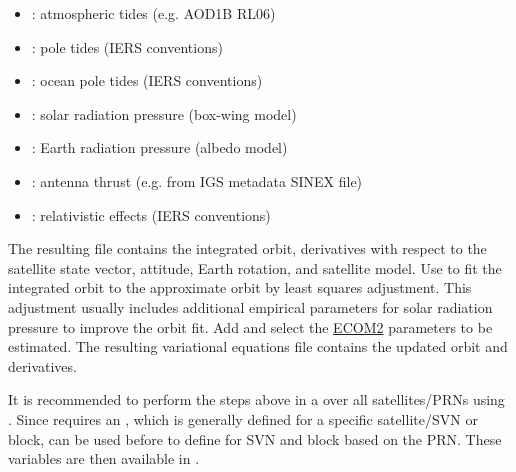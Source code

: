 \begin{itemize}
  \item {}: atmospheric tides (e.g. AOD1B RL06)
  \item {}: pole tides (IERS conventions)
  \item {}: ocean pole tides (IERS conventions)
  \item {}:
        solar radiation pressure (box-wing model)
  \item {}: Earth radiation pressure (albedo model)
  \item {}:
        antenna thrust (e.g. from IGS metadata SINEX file)
  \item {}:
        relativistic effects (IERS conventions)
\end{itemize}

The resulting  file contains the integrated orbit, derivatives
with respect to the satellite state vector, attitude, Earth rotation, and satellite model.
Use  to fit the integrated orbit to the approximate orbit by
least squares adjustment. This adjustment usually includes additional empirical parameters for solar radiation
pressure to improve the orbit fit.
Add 
and select the \href{https://doi.org/10.1007/s00190-015-0814-4}{ECOM2} parameters to be estimated.
The resulting variational equations file contains the updated orbit and derivatives.

It is recommended to perform the steps above in a  over all satellites/PRNs
using . Since  requires an
, which is generally defined for a specific satellite/SVN or block,
 can be used before  to define
 for SVN and block based on the PRN.
These variables are then available in .

